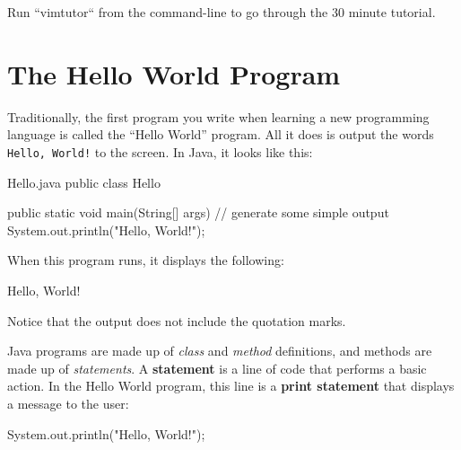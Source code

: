 Run ``vimtutor`` from the command-line to go through the 30 minute tutorial.

\section{The Hello World Program}
\label{hello}

Traditionally, the first program you write when learning a new programming language is called the ``Hello World'' program.
All it does is output the words {\tt Hello, World!} to the screen.
In Java, it looks like this:



\begin{trinket}[235]{Hello.java}
public class Hello {

    public static void main(String[] args) {
        // generate some simple output
        System.out.println("Hello, World!");
    }
}
\end{trinket}

When this program runs, it displays the following:

\begin{stdout}
Hello, World!
\end{stdout}

Notice that the output does not include the quotation marks.




Java programs are made up of {\em class} and {\em method} definitions, and methods are made up of {\em statements}.
A {\bf statement} is a line of code that performs a basic action.
In the Hello World program, this line is a {\bf print statement} that displays a message to the user:

\begin{code}
System.out.println("Hello, World!");
\end{code}

